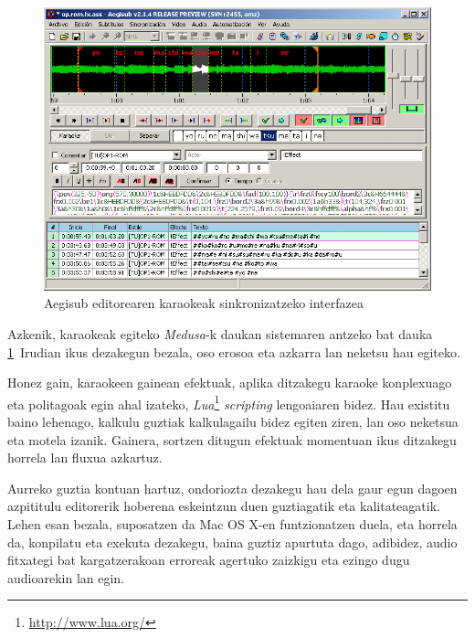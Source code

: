 \begin{figure}[htp]
\begin{center}
\includegraphics[width=\columnwidth, natwidth=728pt, natheight=532pt]{Pictures/Chapter2/aegisub-karaoke.png}
\caption{Aegisub editorearen karaokeak sinkronizatzeko interfazea}
\label{aegisub-karaoke}
\end{center}
\end{figure}

Azkenik, karaokeak egiteko \textit{Medusa}-k daukan sistemaren antzeko bat dauka \ref{aegisub-karaoke}~Irudian ikus dezakegun bezala, oso erosoa eta azkarra lan neketsu hau egiteko.

Honez gain, karaokeen gainean efektuak, aplika ditzakegu karaoke konplexuago eta politagoak egin ahal izateko, \textit{Lua}\footnote{\url{http://www.lua.org/}} \textit{scripting} lengoaiaren bidez. Hau existitu baino lehenago, kalkulu guztiak kalkulagailu bidez egiten ziren, lan oso neketsua eta motela izanik. Gainera, sortzen ditugun efektuak momentuan ikus ditzakegu horrela lan fluxua azkartuz.

Aurreko guztia kontuan hartuz, ondoriozta dezakegu hau dela gaur egun dagoen azpititulu editorerik hoberena eskeintzun duen guztiagatik eta kalitateagatik. Lehen esan bezala, suposatzen da Mac OS X-en funtzionatzen duela, eta horrela da, konpilatu eta exekuta dezakegu, baina guztiz apurtuta dago, adibidez, audio fitxategi bat kargatzerakoan erroreak agertuko zaizkigu eta ezingo dugu audioarekin lan egin.

